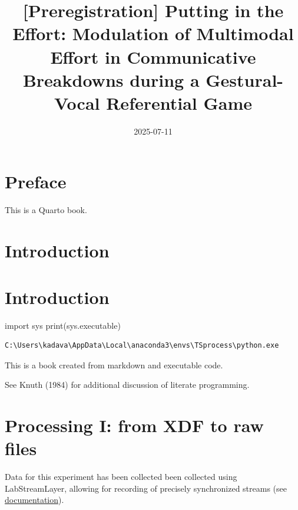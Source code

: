 \documentclass[
  letterpaper,
  DIV=11,
  numbers=noendperiod]{scrreprt}
\title{{[}Preregistration{]} Putting in the Effort: Modulation of
Multimodal Effort in Communicative Breakdowns during a Gestural-Vocal
Referential Game}
\author{}
\date{2025-07-11}
\newenvironment{Shaded}{\begin{snugshade}}{\end{snugshade}}
\newcommand{\BuiltInTok}[1]{\textcolor[rgb]{0.00,0.23,0.31}{#1}}
\newcommand{\ImportTok}[1]{\textcolor[rgb]{0.00,0.46,0.62}{#1}}
\newcommand{\NormalTok}[1]{\textcolor[rgb]{0.00,0.23,0.31}{#1}}
\renewcommand*\contentsname{Table of contents}
\newcommand\contentsname{Table of contents}
\begin{document}
\maketitle

\renewcommand*\contentsname{Table of contents}
{
\hypersetup{linkcolor=}
\setcounter{tocdepth}{2}
\tableofcontents
}

\chapter*{Preface}\label{preface}


This is a Quarto book.


\chapter{Introduction}\label{introduction}


\chapter{Introduction}\label{introduction-1}

\begin{Shaded}
\begin{Highlighting}[]
\ImportTok{import}\NormalTok{ sys}
\BuiltInTok{print}\NormalTok{(sys.executable)}
\end{Highlighting}
\end{Shaded}

\begin{verbatim}
C:\Users\kadava\AppData\Local\anaconda3\envs\TSprocess\python.exe
\end{verbatim}

This is a book created from markdown and executable code.

See Knuth (1984) for additional discussion of literate programming.


\chapter{Processing I: from XDF to raw
files}\label{processing-i-from-xdf-to-raw-files}

Data for this experiment has been collected been collected using
LabStreamLayer, allowing for recording of precisely synchronized streams
(see \href{https://github.com/sccn/labstreaminglayer}{documentation}).
\end{document}
